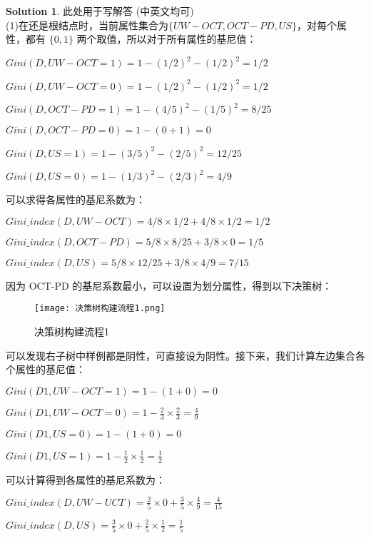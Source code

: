\documentclass[a4paper]{article}
\numberwithin{equation}{section}
\theoremstyle{definition}
\newtheorem*{solution}{Solution}
\begin{document}
\begin{solution}
	此处用于写解答 (中英文均可)\\
 (1)在还是根结点时，当前属性集合为$\lbrace UW-OCT, OCT-P D, US\rbrace$，对每个属性，都有 $\lbrace 0, 1 \rbrace$ 两个取值，所以对于所有属性的基尼值：

$Gini(D, UW-OCT = 1) = 1 − (1/2)^2 − (1/2)^2 = 1/2$

$Gini(D, UW-OCT = 0) = 1 − (1/2)^2 − (1/2)^2 = 1/2$

$Gini(D, OCT-PD = 1) = 1 − (4/5)^2 − (1/5)^2 = 8/25$

$Gini(D, OCT-PD = 0) = 1 − (0 + 1) = 0$

$Gini(D, US = 1) = 1 − (3/5)^2 − (2/5)^2 = 12/25$

$Gini(D, US = 0) = 1 − (1/3)^2 − (2/3)^2 = 4/9$

可以求得各属性的基尼系数为：

$Gini\_index(D, UW-OCT) = 4/8 × 1/2 + 4/8 × 1/2 = 1/2$

$Gini\_index(D, OCT-P D) = 5/8 × 8/25 + 3/8 × 0 = 1/5$

$Gini\_index(D, US) = 5/8 × 12/25 + 3/8 × 4/9 = 7/15$

因为 OCT-PD 的基尼系数最小，可以设置为划分属性，得到以下决策树：
 \begin{figure}[H]
    \centering
    \texttt{[image: 决策树构建流程1.png]}\\
    \caption{决策树构建流程1}
    \label{fig:roc}
\end{figure}

可以发现右子树中样例都是阴性，可直接设为阴性。接下来，我们计算左边集合各个属性的基尼值：

$Gini(D1, UW-OCT = 1) = 1 − (1 + 0) = 0$

$Gini(D1, UW-OCT = 0) = 1 − \frac{2}{3} × \frac{2}{3} = \frac{4}{9}$

$Gini(D1, US = 0) = 1 − (1 + 0) = 0$

$Gini(D1, US = 1) = 1 − \frac{1}{2} × \frac{1}{2} = \frac{1}{2}$

可以计算得到各属性的基尼系数为：

$Gini\_index(D, UW-UCT) = \frac{2}{5} × 0 + \frac{3}{5} × \frac{4}{9} = \frac{4}{15}$

$Gini\_index(D, US) = \frac{3}{5} × 0 + \frac{2}{5} × \frac{1}{2} = \frac{1}{5}$


\end{solution}
\end{document}
